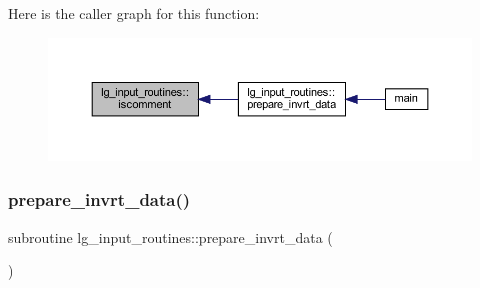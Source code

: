 Here is the caller graph for this function\+:\nopagebreak
\begin{figure}[H]
\begin{center}
\leavevmode
\includegraphics[width=350pt]{namespacelg__input__routines_a8433a2003dce3e9ebdd1aa0a11e16538_icgraph}
\end{center}
\end{figure}
\mbox{\label{namespacelg__input__routines_a3118d974d52f2c98169709e887ceb344}} 
\subsubsection{\texorpdfstring{prepare\+\_\+invrt\+\_\+data()}{prepare\_invrt\_data()}}
{\footnotesize\ttfamily subroutine lg\+\_\+input\+\_\+routines\+::prepare\+\_\+invrt\+\_\+data (\begin{DoxyParamCaption}{ }\end{DoxyParamCaption})}


